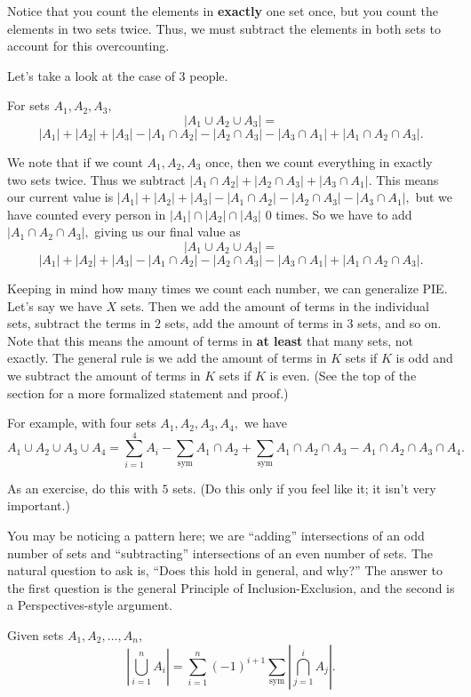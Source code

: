 \documentclass[blue,onecol]{shooting}
\begin{document}
\begin{pro}
Notice that you count the elements in \textbf{exactly} one set once, but you count the elements in two sets twice. Thus, we must subtract the elements in both sets to account for this overcounting.
\end{pro}

Let's take a look at the case of $3$ people.

\begin{theo}
For sets $A_1,A_2,A_3,$
\[|A_1\cup A_2\cup A_3|=\]
\[|A_1|+|A_2|+|A_3|-|A_1\cap A_2|-|A_2\cap A_3|- |A_3\cap A_1|+|A_1\cap A_2\cap A_3|.\]
\end{theo}

\begin{pro}
We note that if we count $A_1,A_2,A_3$ once, then we count everything in exactly two sets twice. Thus we subtract $|A_1\cap A_2|+|A_2\cap A_3|+|A_3\cap A_1|.$ This means our current value is $|A_1|+|A_2|+|A_3|-|A_1\cap A_2|-|A_2\cap A_3|- |A_3\cap A_1|,$ but we have counted every person in $|A_1|\cap |A_2|\cap |A_3|$ $0$ times. So we have to add $|A_1\cap A_2\cap A_3|,$ giving us our final value as
$$|A_1\cup A_2\cup A_3|=$$
$$|A_1|+|A_2|+|A_3|-|A_1\cap A_2|-|A_2\cap A_3|- |A_3\cap A_1|+|A_1\cap A_2\cap A_3|.$$
\end{pro}

Keeping in mind how many times we count each number, we can generalize PIE. Let's say we have $X$ sets. Then we add the amount of terms in the individual sets, subtract the terms in $2$ sets, add the amount of terms in $3$ sets, and so on. Note that this means the amount of terms in \textbf{at least} that many sets, not exactly. The general rule is we add the amount of terms in $K$ sets if $K$ is odd and we subtract the amount of terms in $K$ sets if $K$ is even. (See the top of the section for a more formalized statement and proof.)

For example, with four sets $A_1,A_2,A_3,A_4,$ we have $$A_1\cup A_2\cup A_3\cup A_4=\sum\limits_{i=1}^{4}A_i-\sum\limits_{\text{sym}}A_1\cap A_2+\sum\limits_{\text{sym}}A_1\cap A_2\cap A_3-A_1\cap A_2\cap A_3 \cap A_4.$$

As an exercise, do this with $5$ sets. (Do this only if you feel like it; it isn't very important.)

You may be noticing a pattern here; we are ``adding'' intersections of an odd number of sets and ``subtracting'' intersections of an even number of sets. The natural question to ask is, ``Does this hold in general, and why?'' The answer to the first question is the general Principle of Inclusion-Exclusion, and the second is a Perspectives-style argument.
\begin{theo}
Given sets $A_1,A_2,\dots,A_n,$
$$|\bigcup_{i=1}^n A_i|=\sum\limits_{i=1}^{n} (-1)^{i+1}\sum\limits_{\text{sym}}|\bigcap_{j=1}^{i} A_j|.$$
\end{theo}
\end{document}

